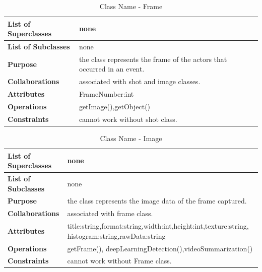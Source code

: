 \documentclass[12pt]{article}
\begin{document}
\begin{table}[h!]
\caption{Class Name - Frame}
\label{tab:my-table}
\begin{tabular}{|p{}|p{}|}


 \hline
\textbf{List of Superclasses}  &    none                                             
\\ \hline
\textbf{List of Subclasses}    & none                                                                 
\\ \hline
\textbf{Purpose}               & the class represents the frame of the actors that occurred in an event. 
\\ \hline
\textbf{Collaborations}        & associated with shot and image classes. 
\\ \hline
\textbf{Attributes}  & FrameNumber:int
\\ \hline
\textbf{Operations} & getImage(),getObject()
\\ \hline
\textbf{Constraints} & cannot work without shot class.
\\ \hline
\end{tabular}
\end{table}


\begin{table}[h!]
\caption{Class Name - Image}
\label{tab:my-table}
\begin{tabular}{|p{}|p{}|}


 \hline
\textbf{List of Superclasses}  &    none                                             
\\ \hline
\textbf{List of Subclasses}    & none                                                                 
\\ \hline
\textbf{Purpose}               & the class represents the image data of the frame captured.
\\ \hline
\textbf{Collaborations}        & associated with frame class. 
\\ \hline
\textbf{Attributes}  & title:string,format:string,width:int,height:int,texture:string,
histogram:string,rawData:string
\\ \hline
\textbf{Operations} & getFrame(), deepLearningDetection(),videoSummarization()
\\ \hline
\textbf{Constraints} & cannot work without Frame class.
\\ \hline
\end{tabular}
\end{table}
\end{document}
